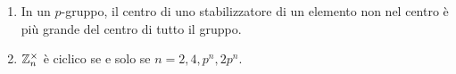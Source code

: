 \begin{multicols}{2}
\begin{enumerate}
		\item In un $ p $-gruppo, il centro di uno stabilizzatore di un elemento non nel centro è più grande del centro di tutto il gruppo.
		
		\item $ \mathbb{Z}_n^\times $ è ciclico se e solo se $ n = 2, 4, p^n, 2p^n $.
		
	\end{enumerate}
\end{multicols}
	
